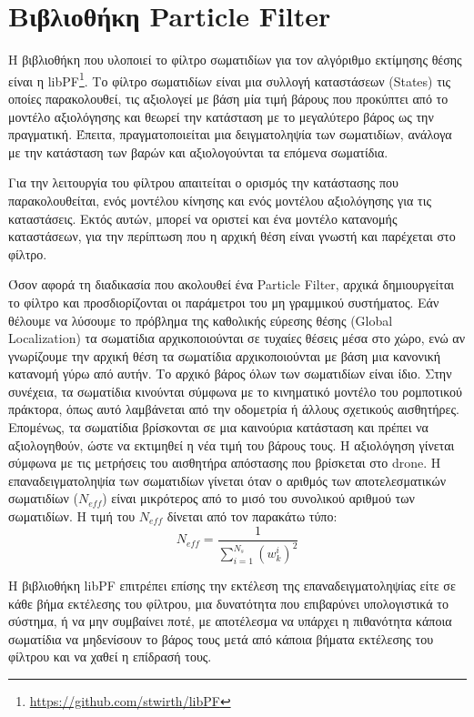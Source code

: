 \section{Βιβλιοθήκη Particle Filter}
\label{section:libpf}

Η βιβλιοθήκη που υλοποιεί το φίλτρο σωματιδίων για τον αλγόριθμο εκτίμησης θέσης είναι η libPF\footnote{\href{https://github.com/stwirth/libPF}{https://github.com/stwirth/libPF}}. Το φίλτρο σωματιδίων είναι μια συλλογή καταστάσεων (States) τις οποίες παρακολουθεί, τις αξιολογεί με βάση μία τιμή βάρους που προκύπτει από το μοντέλο αξιολόγησης και θεωρεί την κατάσταση με το μεγαλύτερο βάρος ως την πραγματική. Έπειτα, πραγματοποιείται μια δειγματοληψία των σωματιδίων, ανάλογα με την κατάσταση των βαρών και αξιολογούνται τα επόμενα σωματίδια.

Για την λειτουργία του φίλτρου απαιτείται ο ορισμός την κατάστασης που παρακολουθείται, ενός μοντέλου κίνησης και ενός μοντέλου αξιολόγησης για τις καταστάσεις. Εκτός αυτών, μπορεί να οριστεί και ένα μοντέλο κατανομής καταστάσεων, για την περίπτωση που η αρχική θέση είναι γνωστή και παρέχεται στο φίλτρο.

Όσον αφορά τη διαδικασία που ακολουθεί ένα Particle Filter, αρχικά δημιουργείται το φίλτρο και προσδιορίζονται οι παράμετροι του μη γραμμικού συστήματος. Εάν θέλουμε να λύσουμε το πρόβλημα της καθολικής εύρεσης θέσης (Global Localization) τα σωματίδια αρχικοποιούνται σε τυχαίες θέσεις μέσα στο χώρο, ενώ αν γνωρίζουμε την αρχική θέση τα σωματίδια αρχικοποιούνται με βάση μια κανονική κατανομή γύρω από αυτήν. Το αρχικό βάρος όλων των σωματιδίων είναι ίδιο. Στην συνέχεια, τα σωματίδια κινούνται σύμφωνα με το κινηματικό μοντέλο του ρομποτικού πράκτορα, όπως αυτό λαμβάνεται από την οδομετρία ή άλλους σχετικούς αισθητήρες. Επομένως, τα σωματίδια βρίσκονται σε μια καινούρια κατάσταση και πρέπει να αξιολογηθούν, ώστε να εκτιμηθεί η νέα τιμή του βάρους τους. Η αξιολόγηση γίνεται σύμφωνα με τις μετρήσεις του αισθητήρα απόστασης που βρίσκεται στο drone. Η επαναδειγματοληψία των σωματιδίων γίνεται όταν ο αριθμός των αποτελεσματικών σωματιδίων ($N_{eff}$) είναι μικρότερος από το μισό του συνολικού αριθμού των σωματιδίων. Η τιμή του $N_{eff}$ δίνεται από τον παρακάτω τύπο:
\begin{equation*}
     N_{eff} = \frac{1}{\sum_{i=1}^{N_s} (w_k^i)^2}
\end{equation*}

Η βιβλιοθήκη libPF επιτρέπει επίσης την εκτέλεση της επαναδειγματοληψίας είτε σε κάθε βήμα εκτέλεσης του φίλτρου, μια δυνατότητα που επιβαρύνει υπολογιστικά το σύστημα, ή να μην συμβαίνει ποτέ, με αποτέλεσμα να υπάρχει η πιθανότητα κάποια σωματίδια να μηδενίσουν το βάρος τους μετά από κάποια βήματα εκτέλεσης του φίλτρου και να χαθεί η επίδρασή τους.